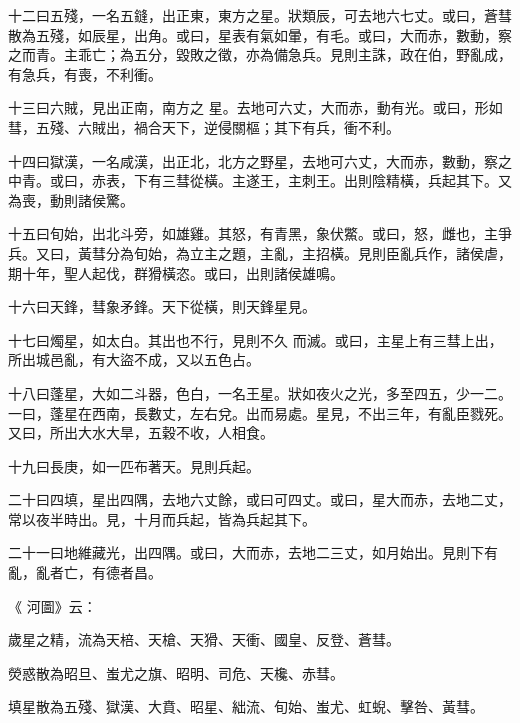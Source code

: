 \begin{pinyinscope}
 十二曰五殘，一名五鏠，出正東，東方之星。狀類辰，可去地六七丈。或曰，蒼彗散為五殘，如辰星，出角。或曰，星表有氣如暈，有毛。或曰，大而赤，數動，察之而青。主乖亡；為五分，毀敗之徵，亦為備急兵。見則主誅，政在伯，野亂成，有急兵，有喪，不利衝。



 十三曰六賊，見出正南，南方之
 星。去地可六丈，大而赤，動有光。或曰，形如彗，五殘、六賊出，禍合天下，逆侵關樞；其下有兵，衝不利。



 十四曰獄漢，一名咸漢，出正北，北方之野星，去地可六丈，大而赤，數動，察之中青。或曰，赤表，下有三彗從橫。主遂王，主刺王。出則陰精橫，兵起其下。又為喪，動則諸侯驚。



 十五曰旬始，出北斗旁，如雄雞。其怒，有青黑，象伏鱉。或曰，怒，雌也，主爭兵。又曰，黃彗分為旬始，為立主之題，主亂，主招橫。見則臣亂兵作，諸侯虐，期十年，聖人起伐，群猾橫恣。或曰，出則諸侯雄鳴。



 十六曰天鋒，彗象矛鋒。天下從橫，則天鋒星見。



 十七曰燭星，如太白。其出也不行，見則不久
 而滅。或曰，主星上有三彗上出，所出城邑亂，有大盜不成，又以五色占。



 十八曰蓬星，大如二斗器，色白，一名王星。狀如夜火之光，多至四五，少一二。一曰，蓬星在西南，長數丈，左右兌。出而易處。星見，不出三年，有亂臣戮死。又曰，所出大水大旱，五穀不收，人相食。



 十九曰長庚，如一匹布著天。見則兵起。



 二十曰四填，星出四隅，去地六丈餘，或曰可四丈。或曰，星大而赤，去地二丈，常以夜半時出。見，十月而兵起，皆為兵起其下。



 二十一曰地維藏光，出四隅。或曰，大而赤，去地二三丈，如月始出。見則下有亂，亂者亡，有德者昌。



 《
 河圖》云：



 歲星之精，流為天棓、天槍、天猾、天衝、國皇、反登、蒼彗。



 熒惑散為昭旦、蚩尤之旗、昭明、司危、天欃、赤彗。



 填星散為五殘、獄漢、大賁、昭星、絀流、旬始、蚩尤、虹蜺、擊咎、黃彗。




\end{pinyinscope}
